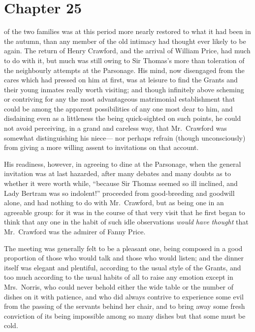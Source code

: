 \chapter{Chapter 25}

 of the two families was at this period
more nearly restored to what it had been in the autumn,
than any member of the old intimacy had thought ever
likely to be again.  The return of Henry Crawford,
and the arrival of William Price, had much to do with it,
but much was still owing to Sir Thomas's more than toleration
of the neighbourly attempts at the Parsonage.  His mind,
now disengaged from the cares which had pressed on him
at first, was at leisure to find the Grants and their
young inmates really worth visiting; and though infinitely
above scheming or contriving for any the most advantageous
matrimonial establishment that could be among the apparent
possibilities of any one most dear to him, and disdaining
even as a littleness the being quick-sighted on such points,
he could not avoid perceiving, in a grand and careless way,
that Mr.\ Crawford was somewhat distinguishing his niece---%
nor perhaps refrain (though unconsciously) from giving a
more willing assent to invitations on that account.

His readiness, however, in agreeing to dine at the Parsonage,
when the general invitation was at last hazarded,
after many debates and many doubts as to whether it were
worth while, ``because Sir Thomas seemed so ill inclined,
and Lady Bertram was so indolent!'' proceeded from
good-breeding and goodwill alone, and had nothing to do
with Mr.\ Crawford, but as being one in an agreeable group:
for it was in the course of that very visit that he first
began to think that any one in the habit of such idle
observations \emph{would} \emph{have} \emph{thought} that Mr.\ Crawford
was the admirer of Fanny Price.

The meeting was generally felt to be a pleasant one,
being composed in a good proportion of those who would talk
and those who would listen; and the dinner itself was elegant
and plentiful, according to the usual style of the Grants,
and too much according to the usual habits of all to raise
any emotion except in Mrs.\ Norris, who could never behold
either the wide table or the number of dishes on it
with patience, and who did always contrive to experience
some evil from the passing of the servants behind her chair,
and to bring away some fresh conviction of its being
impossible among so many dishes but that some must be cold.

